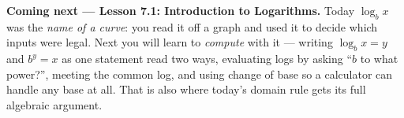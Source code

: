 \documentclass[10pt]{article}
\begin{document}
\begin{spiralbox}
\textbf{Coming next --- Lesson 7.1: Introduction to Logarithms.} Today $\log_b x$ was the
\emph{name of a curve}: you read it off a graph and used it to decide which inputs were legal. Next
you will learn to \emph{compute} with it --- writing $\log_b x = y$ and $b^y = x$ as one statement
read two ways, evaluating logs by asking ``$b$ to what power?'', meeting the common log, and using
change of base so a calculator can handle any base at all. That is also where today's domain rule
gets its full algebraic argument.
\end{spiralbox}
\end{document}
